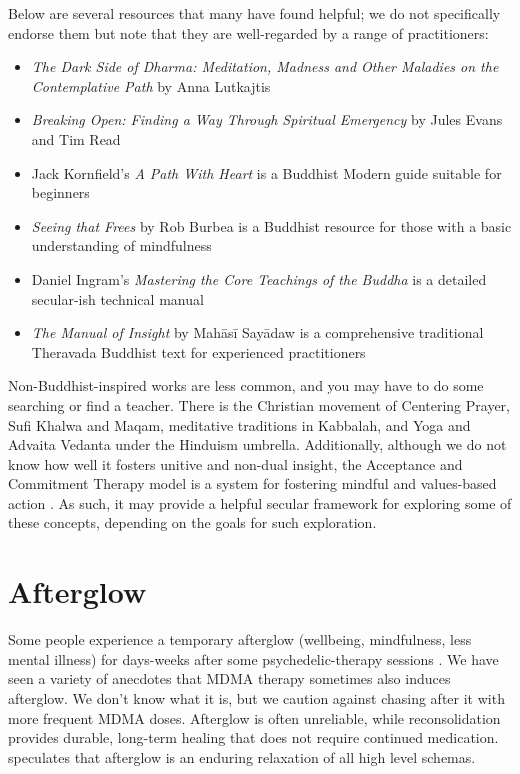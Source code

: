 \documentclass[12pt,letterpaper]{book}
\begin{document}
Below are several resources that many have found helpful; we do not specifically endorse them but note that they are well-regarded by a range of practitioners:
\begin{itemize}
    \item \textit{The Dark Side of Dharma: Meditation, Madness and Other Maladies on the Contemplative Path} by Anna Lutkajtis \cite{lutkajtis2021dark}
    \item \textit{Breaking Open: Finding a Way Through Spiritual Emergency} by Jules Evans and Tim Read \cite{evans2020}
    \item Jack Kornfield's \textit{A Path With Heart} is a Buddhist Modern guide suitable for beginners \cite{kornfield1993path}
    \item \textit{Seeing that Frees} by Rob Burbea is a Buddhist resource for those with a basic understanding of mindfulness \cite{burbea2014seeing}
    \item Daniel Ingram's \textit{Mastering the Core Teachings of the Buddha} is a detailed secular-ish technical manual \cite{ingram2018mastering}
    \item \textit{The Manual of Insight} by Mahāsī Sayādaw is a comprehensive traditional Theravada Buddhist text for experienced practitioners \cite{sayadaw2016manual}
\end{itemize}
Non-Buddhist-inspired works are less common, and you may have to do some searching or find a teacher. There is the Christian movement of Centering Prayer, Sufi Khalwa and Maqam, meditative traditions in Kabbalah, and Yoga and Advaita Vedanta under the Hinduism umbrella. Additionally, although we do not know how well it fosters unitive and non-dual insight, the Acceptance and Commitment Therapy model is a system for fostering mindful and values-based action \cite{actSimple}. As such, it may provide a helpful secular framework for exploring some of these concepts, depending on the goals for such exploration.
\section{Afterglow}
Some people experience a temporary afterglow (wellbeing, mindfulness, less mental illness) for days-weeks after some psychedelic-therapy sessions \cite{evansAfterglow}. We have seen a variety of anecdotes that MDMA therapy sometimes also induces afterglow. We don't know what it is, but we caution against chasing after it with more frequent MDMA doses. Afterglow is often unreliable, while reconsolidation provides durable, long-term healing that does not require continued medication. \textcite{carhart2019rebus} speculates that afterglow is an enduring relaxation of all high level schemas.
\end{document}
